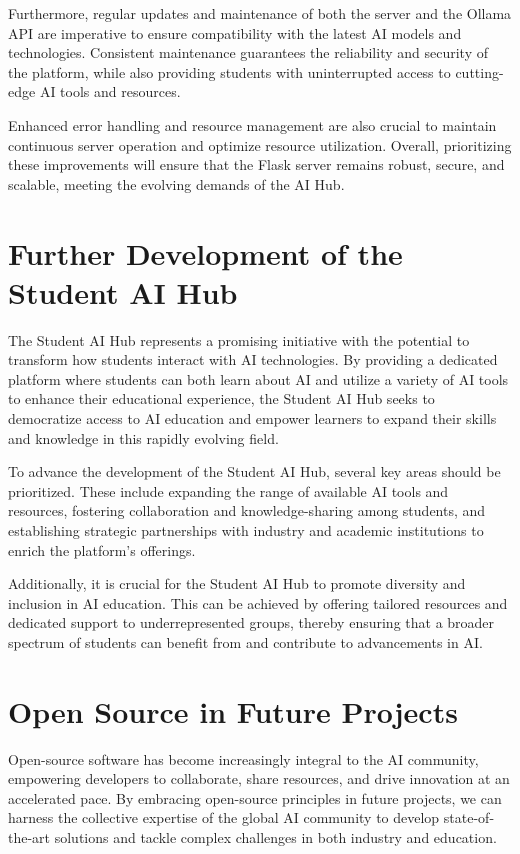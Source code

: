 Furthermore, regular updates and maintenance of both the server and the Ollama API are imperative to ensure compatibility with the latest AI models and technologies. Consistent maintenance guarantees the reliability and security of the platform, while also providing students with uninterrupted access to cutting-edge AI tools and resources.

Enhanced error handling and resource management are also crucial to maintain continuous server operation and optimize resource utilization. Overall, prioritizing these improvements will ensure that the Flask server remains robust, secure, and scalable, meeting the evolving demands of the AI Hub.

\section{Further Development of the Student AI Hub}

The Student AI Hub represents a promising initiative with the potential to transform how students interact with AI technologies. By providing a dedicated platform where students can both learn about AI and utilize a variety of AI tools to enhance their educational experience, the Student AI Hub seeks to democratize access to AI education and empower learners to expand their skills and knowledge in this rapidly evolving field.

To advance the development of the Student AI Hub, several key areas should be prioritized. These include expanding the range of available AI tools and resources, fostering collaboration and knowledge-sharing among students, and establishing strategic partnerships with industry and academic institutions to enrich the platform’s offerings.

Additionally, it is crucial for the Student AI Hub to promote diversity and inclusion in AI education. This can be achieved by offering tailored resources and dedicated support to underrepresented groups, thereby ensuring that a broader spectrum of students can benefit from and contribute to advancements in AI.

\section{Open Source in Future Projects}

Open-source software has become increasingly integral to the AI community, empowering developers to collaborate, share resources, and drive innovation at an accelerated pace. By embracing open-source principles in future projects, we can harness the collective expertise of the global AI community to develop state-of-the-art solutions and tackle complex challenges in both industry and education.


